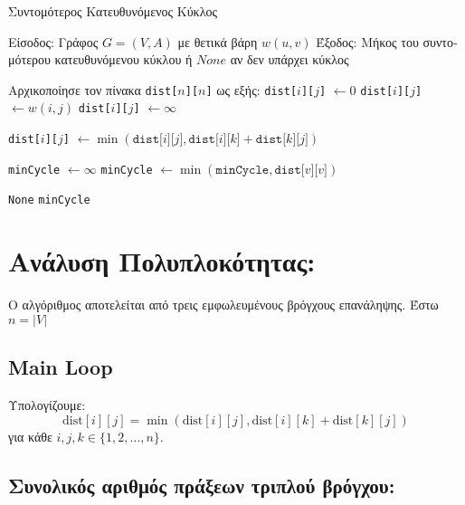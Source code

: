 \documentclass{article}
\begin{document}
\begin{algorithm}[H]
\caption{\textgreek{Συντομότερος Κατευθυνόμενος Κύκλος}}
\begin{algorithmic}[1]
\Statex \textgreek{Είσοδος: Γράφος $G = (V, A)$ με θετικά βάρη $w(u, v)$}
\Statex \textgreek{Έξοδος: Μήκος του συντομότερου κατευθυνόμενου κύκλου ή $None$ αν δεν υπάρχει κύκλος}

\State \textgreek{Αρχικοποίησε τον πίνακα} \texttt{dist[$n$][$n$]} \textgreek{ως εξής}:
        \State \texttt{dist[$i$][$j$]} $\gets 0$
        \State \texttt{dist[$i$][$j$]} $\gets w(i, j)$
    \Else
        \State \texttt{dist[$i$][$j$]} $\gets \infty$
    \EndIf
\EndFor

            \State \texttt{dist[$i$][$j$]} $\gets \min(\texttt{dist[$i$][$j$]}, \texttt{dist[$i$][$k$]} + \texttt{dist[$k$][$j$]})$
        \EndFor
    \EndFor
\EndFor

\State \texttt{minCycle} $\gets \infty$
    \State \texttt{minCycle} $\gets \min(\texttt{minCycle}, \texttt{dist[$v$][$v$]})$
\EndFor

    \State \Return \texttt{None}
\Else
    \State \Return \texttt{minCycle}
\EndIf

\end{algorithmic}
\end{algorithm}

\section*{\textgreek{Ανάλυση Πολυπλοκότητας: }}

\textgreek{Ο αλγόριθμος αποτελείται από τρεις εμφωλευμένους βρόγχους επανάληψης. Έστω \( n = |V| \)}

\subsection*{Main Loop}

\textgreek{Υπολογίζουμε: }
\[
\text{dist}[i][j] = \min(\text{dist}[i][j], \text{dist}[i][k] + \text{dist}[k][j])
\]
\textgreek{για κάθε } \( i, j, k \in \{1, 2, \dots, n\} \).

\subsection*{\textgreek{Συνολικός αριθμός πράξεων τριπλού βρόγχου:} }
\end{document}
